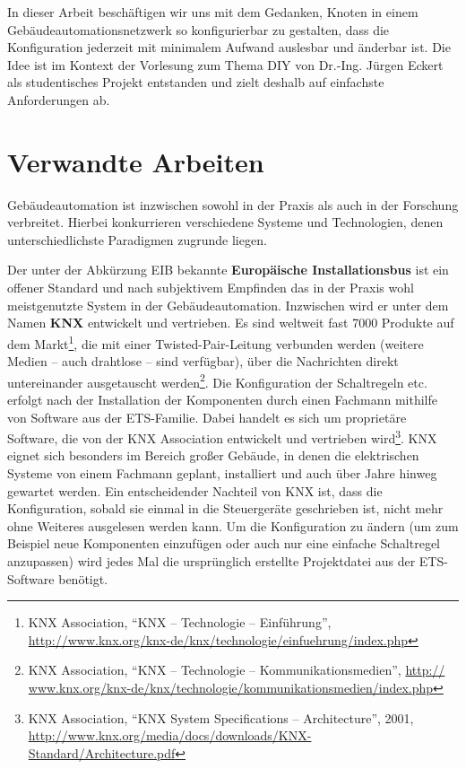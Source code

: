 \documentclass[conference]{IEEEtran}
\begin{document}
    In dieser Arbeit beschäftigen wir uns mit dem Gedanken,
    Knoten in einem Gebäudeautomationsnetzwerk so konfigurierbar zu gestalten,
    dass die Konfiguration jederzeit mit minimalem Aufwand auslesbar
    und änderbar ist.
    Die Idee ist im Kontext der Vorlesung zum Thema \ac{DIY}
    von Dr.-Ing. Jürgen Eckert als studentisches
    Projekt entstanden und zielt deshalb auf einfachste Anforderungen ab.

\section{Verwandte Arbeiten}
    Gebäudeautomation ist inzwischen sowohl in der Praxis
    als auch in der Forschung verbreitet. Hierbei konkurrieren verschiedene Systeme
    und Technologien, denen unterschiedlichste Paradigmen zugrunde liegen.

    Der unter der Abkürzung EIB bekannte \textbf{Europäische Installationsbus}
    ist ein offener Standard und nach subjektivem Empfinden das in der Praxis
    wohl meistgenutzte System in der Gebäudeautomation.
    Inzwischen wird er unter dem Namen \textbf{KNX} entwickelt und vertrieben.
    Es sind weltweit fast 7000 Produkte auf dem Markt\footnote{ KNX Association, \enquote{KNX -- Technologie -- Einführung}, \url{http://www.knx.org/knx-de/knx/technologie/einfuehrung/index.php}},
    die mit einer Twisted-Pair-Leitung verbunden werden
    (weitere Medien -- auch drahtlose -- sind verfügbar),
    über die Nachrichten direkt untereinander ausgetauscht werden\footnote{KNX Association, \enquote{KNX -- Technologie -- Kommunikationsmedien}, \url{http://
www.knx.org/knx-de/knx/technologie/kommunikationsmedien/index.php}}.
    Die Konfiguration der Schaltregeln etc. erfolgt nach der Installation
    der Komponenten durch einen Fachmann mithilfe von Software aus der
    ETS-Familie. Dabei handelt es sich um proprietäre Software,
    die von der KNX Association
    entwickelt und vertrieben wird\footnote{KNX Association,
        \enquote{KNX System Specifications -- Architecture}, 2001,
        \url{http://www.knx.org/media/docs/downloads/KNX-Standard/Architecture.pdf}}.
    KNX eignet sich besonders im Bereich großer Gebäude, in denen die
    elektrischen Systeme von einem Fachmann geplant, installiert und auch über
    Jahre hinweg gewartet werden. Ein entscheidender Nachteil von KNX ist,
    dass die Konfiguration, sobald sie einmal in die Steuergeräte geschrieben
    ist, nicht mehr ohne Weiteres ausgelesen werden kann.
    Um die Konfiguration zu ändern (um zum Beispiel neue Komponenten einzufügen
    oder auch nur eine einfache Schaltregel anzupassen) wird jedes Mal
    die ursprünglich erstellte Projektdatei aus der ETS-Software benötigt.
\end{document}
